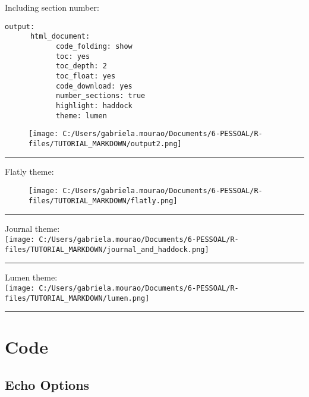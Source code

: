 \documentclass[]{article}
\begin{document}
Including section number:

\begin{verbatim}
output: 
      html_document:
            code_folding: show
            toc: yes
            toc_depth: 2
            toc_float: yes
            code_download: yes
            number_sections: true
            highlight: haddock
            theme: lumen
\end{verbatim}

\begin{figure}
\centering
\texttt{[image: C:/Users/gabriela.mourao/Documents/6-PESSOAL/R-files/TUTORIAL\_MARKDOWN/output2.png]}
\caption{}
\end{figure}

\begin{center}\rule{0.5\linewidth}{\linethickness}\end{center}

 Flatly theme:

\begin{figure}
\centering
\texttt{[image: C:/Users/gabriela.mourao/Documents/6-PESSOAL/R-files/TUTORIAL\_MARKDOWN/flatly.png]}
\caption{}
\end{figure}

\begin{center}\rule{0.5\linewidth}{\linethickness}\end{center}

Journal theme:\\
\texttt{[image: C:/Users/gabriela.mourao/Documents/6-PESSOAL/R-files/TUTORIAL\_MARKDOWN/journal\_and\_haddock.png]}

\begin{center}\rule{0.5\linewidth}{\linethickness}\end{center}

Lumen theme:\\
\texttt{[image: C:/Users/gabriela.mourao/Documents/6-PESSOAL/R-files/TUTORIAL\_MARKDOWN/lumen.png]}

\begin{center}\rule{0.5\linewidth}{\linethickness}\end{center}

\section{Code}\label{code}

\subsection{Echo Options}\label{echo-options}
\end{document}

